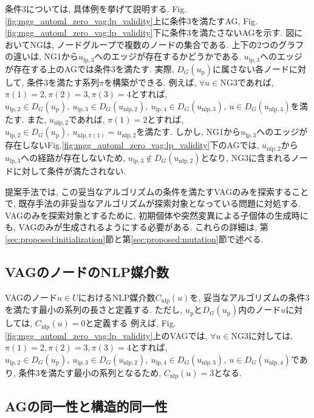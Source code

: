 \documentclass[11pt,oneside,openany,report]{jsbook}
\begin{document}
条件3については, 具体例を挙げて説明する. Fig.\ref{fig:mgg_automl_zero_vag:lp_validity}上に条件3を満たすAG, Fig.\ref{fig:mgg_automl_zero_vag:lp_validity}下に条件3を満たさないAGを示す. 図においてNGは, ノードグループで複数のノードの集合である. 上下の2つのグラフの違いは, NG1から$u_{\mathrm{lp}, 3}$へのエッジが存在するかどうかである. $u_{\mathrm{lp}, 3}$へのエッジが存在する上のAGでは条件3を満たす. 実際, $D_G(u_\mathrm{p})$に属さない各ノードに対して, 条件3を満たす系列$\pi$を構築ができる. 例えば, $\forall u \in \mathrm{NG3}$であれば, $\pi(1) = 2, \pi(2) = 3, \pi(3) = 4$とすれば, $u_{\mathrm{lp}, 2} \in D_G(u_\mathrm{p}),\ u_{\mathrm{lp}, 3} \in D_G(u_{\mathrm{nlp}, 2}),\ u_{\mathrm{lp}, 4} \in D_G(u_{\mathrm{nlp},3}),\ u \in D_G(u_{\mathrm{nlp}, 4})$を満たす. また, $u_{\mathrm{nlp}, 2}$であれば, $\pi(1) = 2$とすれば, $u_{\mathrm{lp}, 2} \in D_G(u_\mathrm{p}),\ u_{\mathrm{nlp}, \pi(1)} = u_{\mathrm{nlp}, 2}$を満たす. しかし, NG1から$u_{\mathrm{lp}, 3}$へのエッジが存在しないFig.\ref{fig:mgg_automl_zero_vag:lp_validity}下のAGでは, $u_{\mathrm{nlp}, 2}$から$u_{\mathrm{lp}, 3}$への経路が存在しないため, $u_{\mathrm{lp}, 3} \not\in D_G(u_{\mathrm{nlp}, 2})$となり, NG3に含まれるノードに対して条件が満たされない.

提案手法では, この妥当なアルゴリズムの条件を満たすVAGのみを探索することで, 既存手法の非妥当なアルゴリズムが探索対象となっている問題に対処する. VAGのみを探索対象とするために, 初期個体や突然変異による子個体の生成時にも, VAGのみが生成されるようにする必要がある. これらの詳細は, 第\ref{sec:proposed:initialization}節と第\ref{sec:proposed:mutation}節で述べる.

\subsection{VAGのノードのNLP媒介数}\label{subsec:proposed:ag:nlp_count}

VAGのノード$u \in U$におけるNLP媒介数$ C_\mathrm{nlp}(u) $を, 妥当なアルゴリズムの条件3を満たす最小の系列の長さと定義する. ただし, $u_\mathrm{p}$と$ D_G(u_\mathrm{p}) $内のノード$u$に対しては, $C_\mathrm{nlp}(u) = 0$と定義する 例えば, Fig.\ref{fig:mgg_automl_zero_vag:lp_validity}上のVAGでは, $\forall u \in \mathrm{NG3}$に対しては, $\pi(1) = 2, \pi(2) = 3, \pi(3) = 4$とすれば, $u_{\mathrm{lp}, 2} \in D_G(u_\mathrm{p}),\ u_{\mathrm{lp}, 3} \in D_G(u_{\mathrm{nlp}, 2}),\ u_{\mathrm{lp}, 4} \in D_G(u_{\mathrm{nlp},3}),\ u \in D_G(u_{\mathrm{nlp}, 4})$であり, 条件3を満たす最小の系列となるため, $C_\mathrm{nlp}(u) = 3$となる.

\subsection{AGの同一性と構造的同一性}\label{subsec:proposed:ag:equivalent}
\end{document}
